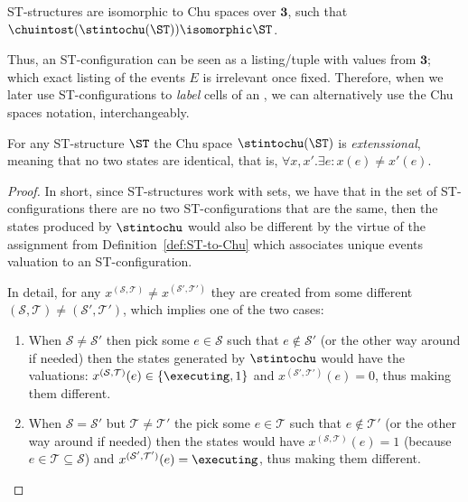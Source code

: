     \begin{proposition}
        \label{prop:ST-structure-Chu-over-3}
        ST-structures are isomorphic to Chu spaces over $\mathbf{3}$, such that $\chuintost(\stintochu(\ST)) \isomorphic \ST$.
    \end{proposition}
    
    Thus, an ST-configuration can be seen as a listing/tuple with values from $\mathbf{3}$; which exact listing of the events $E$ is irrelevant once fixed.  Therefore, when we later use ST-configurations to \emph{label} cells of an \HDA, we can alternatively use the Chu spaces notation, interchangeably.

    \begin{lemma}
        For any ST-structure $\ST$ the Chu space $\stintochu(\ST)$ is \emph{extenssional}, meaning that no two states are identical, that is, $\forall x,x'.\exists e:x(e)\neq x'(e)$.
    \end{lemma}

    \begin{proof}
        In short, since ST-structures work with sets, we have that in the set of ST-configurations there are no two ST-configurations that are the same, then the states produced by $\stintochu$ would also be different by the virtue of the assignment from Definition~\ref{def:ST-to-Chu} which associates unique events valuation to an ST-configuration.

         In detail, for any $x^{(\mathcal{S},\mathcal{T})}\neq x^{(\mathcal{S}',\mathcal{T}')}$ they are created from some different $(\mathcal{S},\mathcal{T})\neq (\mathcal{S}',\mathcal{T}')$, which implies one of the two cases:
        
        \begin{enumerate}
            \item When $\mathcal{S} \neq \mathcal{S}'$ then pick some $e\in \mathcal{S}$ such  that $e\notin \mathcal{S}'$ (or the other way around if needed) then the states generated by $\stintochu$ would have the valuations: $x^{(\mathcal{S},\mathcal{T})}(e)\in\{\executing,1\}$ and $x^{(\mathcal{S}',\mathcal{T}')}(e)=0$, thus making them different.
            \item When $\mathcal{S} = \mathcal{S}'$ but $\mathcal{T} \neq \mathcal{T}'$ the pick some $e \in \mathcal{T}$ such that $e \notin \mathcal{T}'$ (or the other way around if needed) then the states would have  $x^{(\mathcal{S},\mathcal{T})}(e)=1$ (because $e \in \mathcal{T} \subseteq \mathcal{S}$) and $x^{(\mathcal{S}',\mathcal{T}')}(e) = \executing$, thus making them different.
        \end{enumerate}
    \end{proof}

